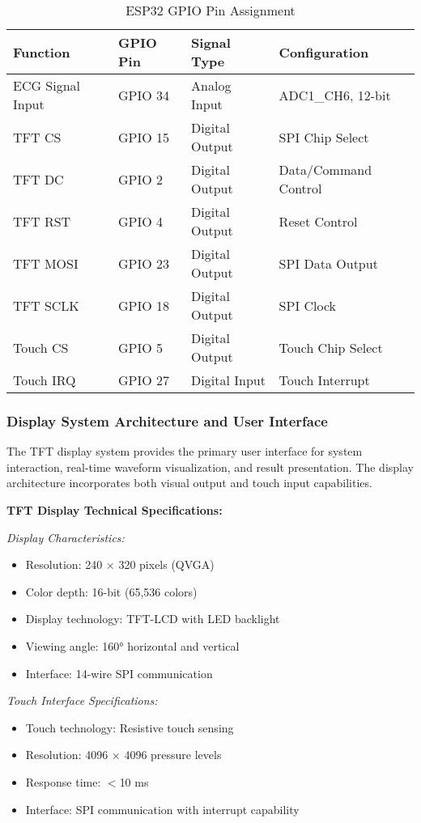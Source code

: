 \documentclass[12pt,a4paper]{article}
\begin{document}
\begin{table}[h]
\centering
\caption{ESP32 GPIO Pin Assignment}
\begin{tabular}{|l|l|l|l|}
\hline
\textbf{Function} & \textbf{GPIO Pin} & \textbf{Signal Type} & \textbf{Configuration} \\
\hline
ECG Signal Input & GPIO 34 & Analog Input & ADC1\_CH6, 12-bit \\
TFT CS & GPIO 15 & Digital Output & SPI Chip Select \\
TFT DC & GPIO 2 & Digital Output & Data/Command Control \\
TFT RST & GPIO 4 & Digital Output & Reset Control \\
TFT MOSI & GPIO 23 & Digital Output & SPI Data Output \\
TFT SCLK & GPIO 18 & Digital Output & SPI Clock \\
Touch CS & GPIO 5 & Digital Output & Touch Chip Select \\
Touch IRQ & GPIO 27 & Digital Input & Touch Interrupt \\
\hline
\end{tabular}
\end{table}

\subsubsection{Display System Architecture and User Interface}

The TFT display system provides the primary user interface for system interaction, real-time waveform visualization, and result presentation. The display architecture incorporates both visual output and touch input capabilities.

\vspace{0.5cm}

\textbf{TFT Display Technical Specifications:}

\textit{Display Characteristics:}
\begin{itemize}
\item Resolution: 240 × 320 pixels (QVGA)
\item Color depth: 16-bit (65,536 colors)
\item Display technology: TFT-LCD with LED backlight
\item Viewing angle: 160° horizontal and vertical
\item Interface: 14-wire SPI communication
\end{itemize}

\textit{Touch Interface Specifications:}
\begin{itemize}
\item Touch technology: Resistive touch sensing
\item Resolution: 4096 × 4096 pressure levels
\item Response time: $<$10 ms
\item Interface: SPI communication with interrupt capability
\end{itemize}
\end{document}
